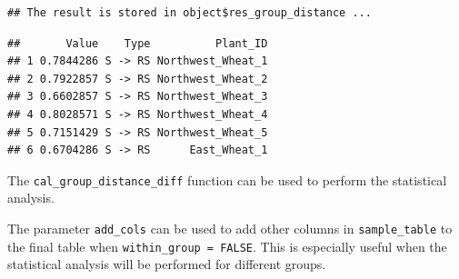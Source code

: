 \documentclass[
]{book}
\newenvironment{Shaded}{\begin{snugshade}}{\end{snugshade}}
\newcommand{\AttributeTok}[1]{\textcolor[rgb]{0.77,0.63,0.00}{#1}}
\newcommand{\CommentTok}[1]{\textcolor[rgb]{0.56,0.35,0.01}{\textit{#1}}}
\newcommand{\FunctionTok}[1]{\textcolor[rgb]{0.00,0.00,0.00}{#1}}
\newcommand{\NormalTok}[1]{#1}
\newcommand{\SpecialCharTok}[1]{\textcolor[rgb]{0.00,0.00,0.00}{#1}}
\newcommand{\StringTok}[1]{\textcolor[rgb]{0.31,0.60,0.02}{#1}}
\begin{document}
\begin{verbatim}
## The result is stored in object$res_group_distance ...
\end{verbatim}

\begin{Shaded}
\end{Shaded}

\begin{verbatim}
##       Value    Type          Plant_ID
## 1 0.7844286 S -> RS Northwest_Wheat_1
## 2 0.7922857 S -> RS Northwest_Wheat_2
## 3 0.6602857 S -> RS Northwest_Wheat_3
## 4 0.8028571 S -> RS Northwest_Wheat_4
## 5 0.7151429 S -> RS Northwest_Wheat_5
## 6 0.6704286 S -> RS      East_Wheat_1
\end{verbatim}

The \texttt{cal\_group\_distance\_diff} function can be used to perform the statistical analysis.

\begin{Shaded}
\end{Shaded}

The parameter \texttt{add\_cols} can be used to add other columns in \texttt{sample\_table} to the final table when \texttt{within\_group\ =\ FALSE}.
This is especially useful when the statistical analysis will be performed for different groups.
\end{document}
